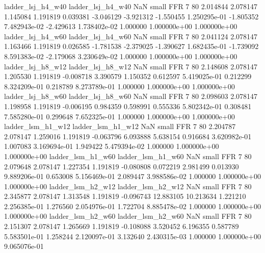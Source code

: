        ladder_lsj_h4_w40        ladder_lsj_h4_w40                   NaN      small      FFR                 7 80 2.014844       2.078147 1.145084       1.191819    0.039381     -3.046129     -3.921312    -1.550455   1.250295e-01 -1.805352 7.482943e-02    -2.429613   1.738402e-02            1.000000    1.000000e+00        1.000000e+00
       ladder_lsj_h4_w60        ladder_lsj_h4_w60                   NaN      small      FFR                 7 80 2.041124       2.078147 1.163466       1.191819    0.026585     -1.781538     -2.379025    -1.390627   1.682435e-01 -1.739092 8.591383e-02    -2.179068   3.230649e-02            1.000000    1.000000e+00        1.000000e+00
       ladder_lsj_h8_w12        ladder_lsj_h8_w12                   NaN      small      FFR                 7 80 2.148608       2.078147 1.205530       1.191819   -0.008718      3.390579      1.150352     0.612597   5.419025e-01  0.212299 8.324209e-01     0.218789   8.273789e-01            1.000000    1.000000e+00        1.000000e+00
       ladder_lsj_h8_w60        ladder_lsj_h8_w60                   NaN      small      FFR                 7 80 2.098603       2.078147 1.198958       1.191819   -0.006195      0.984359      0.598991     0.555336   5.802342e-01  0.308481 7.585280e-01     0.299648   7.652325e-01            1.000000    1.000000e+00        1.000000e+00
       ladder_lsm_h1_w12        ladder_lsm_h1_w12                   NaN      small      FFR                 7 80 2.204787       2.078147 1.259016       1.191819   -0.063796      6.093888      5.638154     0.916684   3.620982e-01  1.007083 3.169694e-01     1.949422   5.479394e-02            1.000000    1.000000e+00        1.000000e+00
       ladder_lsm_h1_w60        ladder_lsm_h1_w60                   NaN      small      FFR                 7 80 2.079648       2.078147 1.227354       1.191819   -0.080808      0.072219      2.981499     0.013930   9.889206e-01  0.653008 5.156469e-01     2.089447   3.988586e-02            1.000000    1.000000e+00        1.000000e+00
       ladder_lsm_h2_w12        ladder_lsm_h2_w12                   NaN      small      FFR                 7 80 2.345877       2.078147 1.313548       1.191819   -0.096743     12.883105     10.213634     1.221210   2.256385e-01  1.276560 2.054976e-01     1.722704   8.885478e-02            1.000000    1.000000e+00        1.000000e+00
       ladder_lsm_h2_w60        ladder_lsm_h2_w60                   NaN      small      FFR                 7 80 2.151307       2.078147 1.265669       1.191819   -0.108088      3.520452      6.196355     0.587789   5.583501e-01  1.258244 2.120097e-01     3.132640   2.430315e-03            1.000000    1.000000e+00        9.065076e-01
